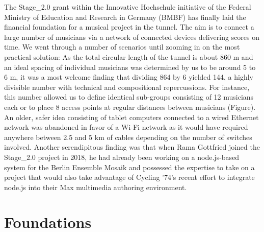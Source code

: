 The Stage\_2.0 grant within the Innovative Hochschule initiative of the Federal Ministry of Education and Research in Germany (BMBF) has finally laid the financial foundation for a musical project in the tunnel. The aim is to connect a large number of musicians via a network of connected devices delivering scores on time. We went through a number of scenarios until zooming in on the most practical solution: As the total circular length of the tunnel is about 860 m and an ideal spacing of individual musicians was determined by us to be around 5 to 6 m, it was a most welcome finding that dividing 864 by 6 yielded 144, a highly divisible number with technical and compositional repercussions. For instance, this number allowed us to define identical sub-groups consisting of 12 musicians each or to place 8 access points at regular distances between musicians (Figure). An older, safer idea consisting of tablet computers connected to a wired Ethernet network was abandoned in favor of a Wi-Fi network as it would have required anywhere between 2.5 and 5 km of cables depending on the number of switches involved. 
Another serendipitous finding was that when Rama Gottfried joined the Stage\_2.0 project in 2018, he had already been working on a node.js-based system for the Berlin Ensemble Mosaik and possessed the expertise to take on a project that would also take advantage of Cycling ’74’s recent effort to integrate node.js into their Max multimedia authoring environment.




\section{Foundations} \label{sec:foundations} 
%
%  
%
%



